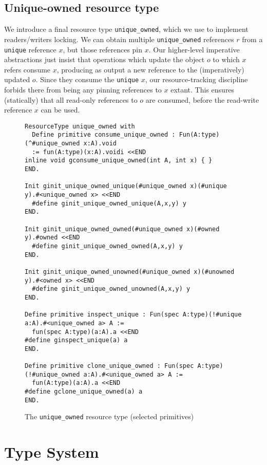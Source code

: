\documentclass[9pt,natbib]{sigplanconf}
\begin{document}
\subsection{Unique-owned resource type}

We introduce a final resource type \texttt{unique\_owned}, which we
use to implement readers/writers locking.  We can obtain multiple
\texttt{unique\_owned} references $r$ from a \texttt{unique} reference
$x$, but those references pin $x$.  Our higher-level imperative
abstractions just insist that operations which update the object $o$
to which $x$ refers consume $x$, producing as output a new reference
to the (imperatively) updated $o$.  Since they consume the
\texttt{unique} $x$, our resource-tracking discipline forbids there
from being any pinning references to $x$ extant.  This ensures
(statically) that all read-only references to $o$ are consumed, before
the read-write reference $x$ can be used.

\begin{figure*}
\small
\begin{verbatim}
ResourceType unique_owned with
  Define primitive consume_unique_owned : Fun(A:type)(^#unique_owned x:A).void
  := fun(A:type)(x:A).voidi <<END
inline void gconsume_unique_owned(int A, int x) { }
END.

Init ginit_unique_owned_unique(#unique_owned x)(#unique y).#<unique_owned x> <<END
  #define ginit_unique_owned_unique(A,x,y) y
END.

Init ginit_unique_owned_owned(#unique_owned x)(#owned y).#owned <<END
  #define ginit_unique_owned_owned(A,x,y) y
END.

Init ginit_unique_owned_unowned(#unique_owned x)(#unowned y).#<owned x> <<END
  #define ginit_unique_owned_unowned(A,x,y) y
END.

Define primitive inspect_unique : Fun(spec A:type)(!#unique a:A).#<unique_owned a> A :=
  fun(spec A:type)(a:A).a <<END
#define ginspect_unique(a) a
END.

Define primitive clone_unique_owned : Fun(spec A:type)(!#unique_owned a:A).#<unique_owned a> A :=
  fun(A:type)(a:A).a <<END
#define gclone_unique_owned(a) a
END.
\end{verbatim}
\caption{The \texttt{unique\_owned} resource type (selected primitives)}
\label{fig:uniqueowned}
\end{figure*}


\section{Type System}
\end{document}
